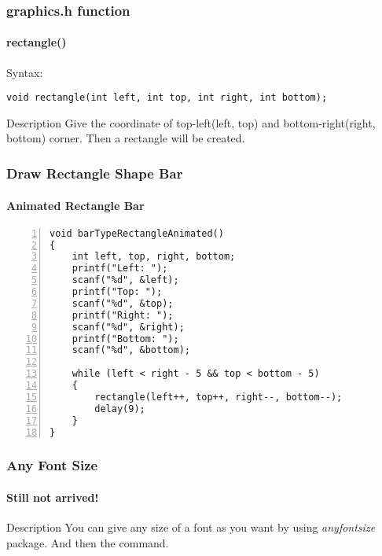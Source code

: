 \begin{frame}[fragile]
\frametitle{graphics.h function}
\framesubtitle{rectangle()}
\pause
\alert{Syntax:}
\begin{lstlisting}
void rectangle(int left, int top, int right, int bottom);
\end{lstlisting}
\pause
\begin{block}{Description}
Give the coordinate of top-left(left, top) and bottom-right(right, bottom) corner. Then a rectangle will be created.
\end{block}
\end{frame}

\begin{frame}[fragile]
\frametitle{Draw Rectangle Shape Bar}
\framesubtitle{Animated Rectangle Bar}
\pause
\begin{lstlisting}[caption=Filling a rectangle with rectangle, basicstyle=\footnotesize, numbers=left]
void barTypeRectangleAnimated()
{
    int left, top, right, bottom;
    printf("Left: ");
    scanf("%d", &left);
    printf("Top: ");
    scanf("%d", &top);
    printf("Right: ");
    scanf("%d", &right);
    printf("Bottom: ");
    scanf("%d", &bottom);

    while (left < right - 5 && top < bottom - 5)
    {
        rectangle(left++, top++, right--, bottom--);
        delay(9);
    }
}
\end{lstlisting}
\end{frame}

\begin{frame}[fragile]
\frametitle{Any Font Size}
\framesubtitle{Still not arrived!}
\begin{block}{Description}
You can give any size of a font as you want by using \textit{anyfontsize} package. And then the command.
\end{block}
\end{frame}


